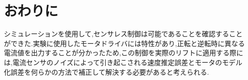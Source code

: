\chapter{おわりに}
シミュレーションを使用して,センサレス制御は可能であることを確認することができた.実験に使用したモータドライバには特性があり,正転と逆転時に異なる電流値を出力することが分かったため,この制御を実際のリフトに適用する際には,電流センサのノイズによって引き起こされる速度推定誤差とモータのモデル化誤差を何らかの方法で補正して解決する必要があると考えられる.